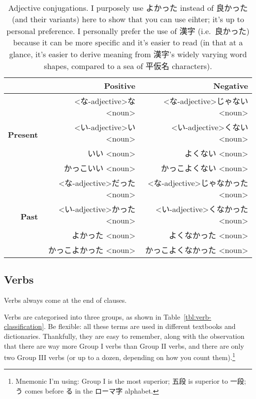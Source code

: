 \documentclass[../nihongo-gakushuu-kyouzai.tex]{subfiles}
\begin{document}
\begin{table}[h]
\centering
\begin{tabular}{@{}rrr@{}}
    \toprule
    & \textbf{Positive} & \textbf{Negative} \\ \midrule
    \multirow{4}{*}{\textbf{Present}} & <な-adjective>な<noun> & <な-adjective>じゃない<noun> \\
    & <い-adjective>い <noun> & <い-adjective>くない <noun> \\
    & いい <noun> & よくない <noun> \\
    & かっこいい <noun> & かっこよくない <noun> \\
    \midrule
    \multirow{4}{*}{\textbf{Past}} &  <な-adjective>だった<noun> &  <な-adjective>じゃなかった<noun> \\
    & <い-adjective>かった <noun> & <い-adjective>くなかった <noun> \\
    & よかった <noun> & よくなかった <noun> \\
    & かっこよかった <noun> & かっこよくなかった <noun> \\ \bottomrule
\end{tabular}%
\caption{Adjective conjugations. I purposely use よかった instead of 良かった (and their variants) here to show that you can use eihter; it's up to personal preference. I personally prefer the use of 漢字 (i.e.\ 良かった) because it can be more specific and it's easier to read (in that at a glance, it's easier to derive meaning from 漢字's widely varying word shapes, compared to a sea of 平仮名 characters). }
\label{tbl:adjective-conjugations}
\end{table}

\subsection{Verbs}
Verbs always come at the end of clauses.

Verbs are categorised into three groups, as shown in Table~\ref{tbl:verb-classification}. Be flexible: all these terms are used in different textbooks and dictionaries. Thankfully, they are easy to remember, along with the observation that there are way more Group I verbs than Group II verbs, and there are only two Group III verbs (or up to a dozen, depending on how you count them).\footnote{Mnemonic I'm using: Group I is the most superior; 五段 is superior to 一段; う comes before る in the ローマ字 alphabet.}
\end{document}
